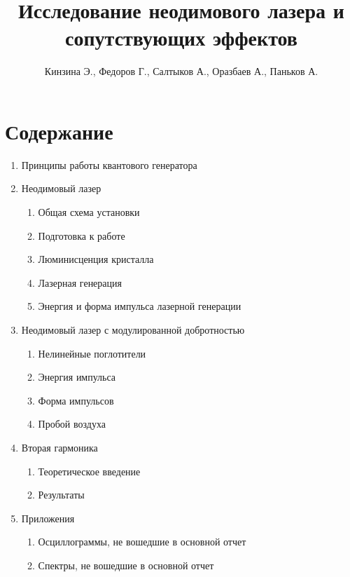 \documentclass[twocolumn]{article}
\title{Исследование неодимового лазера и сопутствующих эффектов}
\author{Кинзина Э., Федоров Г., Салтыков А., Оразбаев А., Паньков А.}
\begin{document}
        
            \maketitle
       

    
\section*{Содержание}
\begin{enumerate}
\def\labelenumi{\arabic{enumi}.}
\item
  Принципы работы квантового генератора
\item
  Неодимовый лазер
    \begin{enumerate}[{2.}1]
    
	\item
  Общая схема установки
  \item
  Подготовка к работе
	\item
  Люминисценция кристалла
	\item
  Лазерная генерация
	\item
  Энергия и форма импульса лазерной генерации
  \end{enumerate}
\item
  Неодимовый лазер с модулированной добротностью
    \begin{enumerate}[{3.}1]

	\item
  Нелинейные поглотители
	\item
  Энергия импульса
	\item
  Форма импульсов
	\item
  Пробой воздуха
  \end{enumerate}
\item
  Вторая гармоника
    \begin{enumerate}[{4.}1]

	\item
  Теоретическое введение
	\item
  Результаты
  \end{enumerate}
\item
  Приложения
    \begin{enumerate}[{5.}1]

	\item
  Осциллограммы, не вошедшие в основной отчет
  
	\item
  Спектры, не вошедшие в основной отчет
  \end{enumerate}
\end{enumerate}
\end{document}
